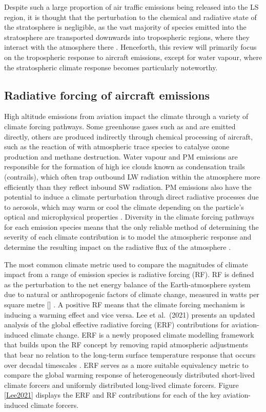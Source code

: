 Despite such a large proportion of air traffic emissions being released into the LS region, it is thought that the perturbation to the chemical and radiative state of the stratosphere is negligible, as the vast majority of species emitted into the stratosphere are transported downwards into tropospheric regions, where they interact with the atmosphere there \cite{Lee2010, Grewe2002, Forster2003}. Henceforth, this review will primarily focus on the tropospheric response to aircraft emissions, except for water vapour, where the stratospheric climate response becomes particularly noteworthy.

\subsection{Radiative forcing of aircraft emissions}
High altitude emissions from aviation impact the climate through a variety of climate forcing pathways. Some greenhouse gases such as  and  are emitted directly, others are produced indirectly through chemical processing of aircraft, such as the reaction of  with atmospheric trace species to catalyse ozone production and methane destruction. Water vapour and PM emissions are responsible for the formation of high ice clouds known as condensation trails (contrails), which often trap outbound LW radiation within the atmosphere more efficiently than they reflect inbound SW radiation. PM emissions also have the potential to induce a climate perturbation through direct radiative processes due to aerosols, which may warm or cool the climate depending on the particle's optical and microphysical properties \cite{Lee2010}. Diversity in the climate forcing pathways for each emission species means that the only reliable method of determining the severity of each climate contribution is to model the atmospheric response and determine the resulting impact on the radiative flux of the atmosphere \cite{Brasseur1998}.

The most common climate metric used to compare the magnitudes of climate impact from a range of emission species is radiative forcing (RF). RF is defined as the perturbation to the net energy balance of the Earth-atmosphere system due to natural or anthropogenic factors of climate change, measured in watts per square metre [] \cite{Fuglestvedt2003}. A positive RF means that the climate forcing mechanism is inducing a warming effect and vice versa. Lee et al.\ (2021) \cite{Lee2021} presents an updated analysis of the global effective radiative forcing (ERF) contributions for aviation-induced climate change. ERF is a newly proposed climate modelling framework that builds upon the RF concept by removing rapid atmospheric adjustments that bear no relation to the long-term surface temperature response that occurs over decadal timescales \cite{Myhre2013}. ERF serves as a more suitable equivalency metric to compare the global warming response of heterogeneously distributed short-lived climate forcers and uniformly distributed long-lived climate forcers. Figure \ref{Lee2021} displays the ERF and RF contributions for each of the key aviation-induced climate forcers.

